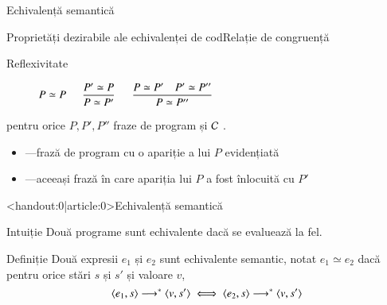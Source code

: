 \documentclass[xcolor=pdftex,romanian,colorlinks]{beamer}
\begin{document}
\begin{section}{Echivalență semantică}


\begin{frame}{Proprietăți dezirabile ale echivalenței de cod}{Relație de congruență}
\begin{description}
\item[Reflexivitate] \hfill $\displaystyle \reg{P \simeq P}{}{}$ \hfill\;
\vitem[Simetrie] \hfill $\displaystyle \reg{P \simeq P'}{P' \simeq P}{}$ \hfill\;
\vitem[Tranzitivitate] \hfill $\displaystyle \reg{P \simeq P''}{P \simeq P' \si P' \simeq P''}{}$ \hfill\;
\vitem[Congruență] \hfill {} \hfill\;
\end{description}
\vfill
pentru orice $P, P', P''$ fraze de program și $\cal C$ .
\vfill
\begin{itemize}
\item[]  —frază de program cu o apariție a lui $P$ evidențiată
\item[]  —aceeași frază în care apariția lui $P$ a fost înlocuită cu $P'$
\end{itemize}
\end{frame}



\begin{frame}<handout:0|article:0>{Echivalență semantică}

\begin{block}{Intuiție}
Două programe sunt echivalente dacă se evaluează la fel.
\end{block}

\begin{block}{Definiție}
Două expresii $e_1$ și $e_2$ sunt echivalente semantic, notat $e_1 \simeq e_2$ dacă pentru orice stări $s$ și $s'$ și valoare $v$,
\[{{\langle{e_1,s}\rangle}}\longrightarrow^\ast{{\ensuremath \langle{v,s'}\rangle}} \iff {{\ensuremath \langle{e_2,s}\rangle}}\longrightarrow^\ast{{\ensuremath \langle{v,s'}\rangle}}\] 
\end{block}
\end{frame}


\end{section}
\end{document}
